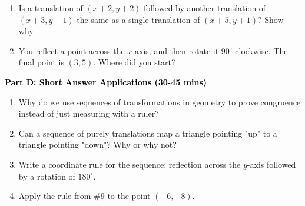 \documentclass[12pt, letterpaper, fleqn]{article}
\begin{document}
\vspace{3mm}

\begin{enumerate}[itemsep=4.2cm, leftmargin=0.6cm, resume]
\item Is a translation of $(x+2, y+2)$ followed by another translation of $(x+3, y-1)$ the same as a single translation of $(x+5, y+1)$? Show why.
\item You reflect a point across the $x$-axis, and then rotate it $90^\circ$ clockwise. The final point is $(3, 5)$. Where did you start?
\end{enumerate}

\newpage

\begin{tcolorbox}[colback=customteal!20]
\large\textcolor{black}{\textbf{Part D: Short Answer Applications (30-45 mins)}}
\end{tcolorbox}

\vspace{3mm}

\begin{enumerate}[itemsep=4.2cm, leftmargin=0.6cm, resume]
\item Why do we use sequences of transformations in geometry to prove congruence instead of just measuring with a ruler?
\item Can a sequence of purely translations map a triangle pointing "up" to a triangle pointing "down"? Why or why not?
\item Write a coordinate rule for the sequence: reflection across the $y$-axis followed by a rotation of $180^\circ$.
\item Apply the rule from \#9 to the point $(-6, -8)$.
\end{enumerate}
\end{document}
